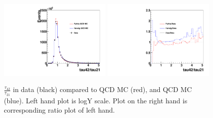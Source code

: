 \begin{figure}[htb]
\begin{center}
\includegraphics[width=0.49\textwidth,angle=0]{EXO-14-009/figs/SFExtra/SFSameJetRatioPlot.pdf}
\includegraphics[width=0.49\textwidth,angle=0]{EXO-14-009/figs/SFExtra/SFRatioRatioPlot.pdf}
\end{center}
\caption{
$\frac{\tau_{42}}{\tau_{21}}$ in data (black) compared to \PYTHIA QCD MC (red), and 
\HERWIG QCD MC (blue). Left hand plot is logY scale. Plot on the right hand is corresponding 
ratio plot of left hand.  
}
\label{fig:tau4221samejet}
\end{figure}

